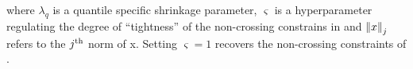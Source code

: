 where $\lambda_q$ is a quantile specific shrinkage parameter, $\varsigma$ is a hyperparameter regulating the degree of ``tightness'' of the non-crossing constrains in \citet{szendrei2023fused} and $\left\lVert x\right\rVert_j$ refers to the $j\textsuperscript{th}$ norm of x. Setting $\varsigma=1$ recovers the non-crossing constraints of \citet{bondell2010noncrossing}. 

